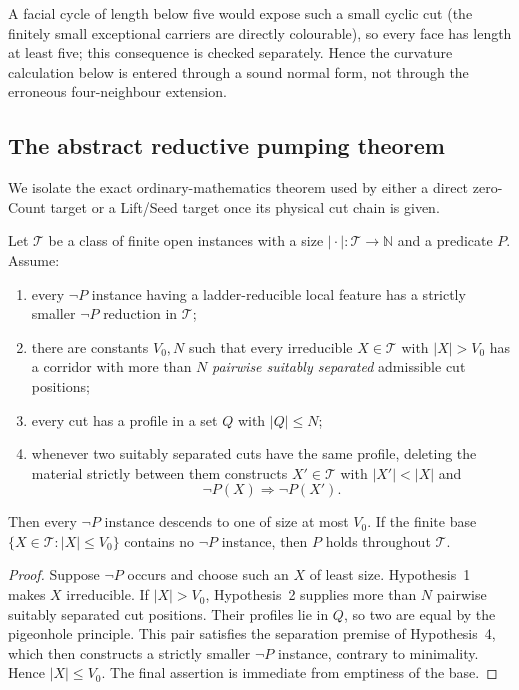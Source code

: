 A facial cycle of length below five would expose such a small cyclic cut (the
finitely small exceptional carriers are directly colourable), so every face
has length at least five; this consequence is checked separately.
Hence the curvature calculation below is entered through a sound normal form,
not through the erroneous four-neighbour extension.

\subsection{The abstract reductive pumping theorem}

We isolate the exact ordinary-mathematics theorem used by either a direct
zero-Count target or a Lift/Seed target once its physical cut chain is given.

\begin{theorem}
\label{thm:finite-profile-reductive-pumping}
Let $\mathcal T$ be a class of finite open instances with a size
$|\!\cdot\!|\colon\mathcal T\to\mathbb N$ and a predicate $P$.  Assume:
\begin{enumerate}
\item every $\neg P$ instance having a ladder-reducible local feature has a
strictly smaller $\neg P$ reduction in $\mathcal T$;
\item there are constants $V_0,N$ such that every irreducible
$X\in\mathcal T$ with $|X|>V_0$ has a corridor with more than $N$
\emph{pairwise suitably separated} admissible cut positions;
\item every cut has a profile in a set $Q$ with $|Q|\le N$;
\item whenever two suitably separated cuts have the same profile, deleting
the material strictly between them constructs $X'\in\mathcal T$ with
$|X'|<|X|$ and
\[
                  \neg P(X)\Longrightarrow\neg P(X').
\]
\end{enumerate}
Then every $\neg P$ instance descends to one of size at most $V_0$.  If the
finite base $\{X\in\mathcal T:|X|\le V_0\}$ contains no $\neg P$ instance,
then $P$ holds throughout $\mathcal T$.
\end{theorem}

\begin{proof}
Suppose $\neg P$ occurs and choose such an $X$ of least size.  Hypothesis~1
makes $X$ irreducible.  If $|X|>V_0$, Hypothesis~2 supplies more than $N$
pairwise suitably separated cut positions.  Their profiles lie in $Q$, so
two are equal by the pigeonhole principle.  This pair satisfies the
separation premise of Hypothesis~4, which then constructs a strictly smaller
$\neg P$
instance, contrary to minimality.  Hence $|X|\le V_0$.  The final assertion
is immediate from emptiness of the base.  \qedhere
\end{proof}

